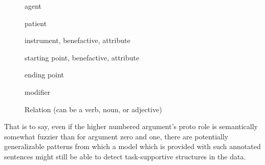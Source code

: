 \begin{description}
  \item[] agent
  \item[] patient
  \item[] instrument, benefactive, attribute
  \item[] starting point, benefactive, attribute
  \item[] ending point
  \item[] modifier
  \item[] Relation (can be a verb, noun, or adjective)
\end{description}

That is to say, even if the higher numbered argument's proto role is semantically somewhat
fuzzier than for argument zero and one, there are potentially generalizable patterns from
which a model which is provided with such annotated sentences might still be able to detect
task-supportive structures in the data.



